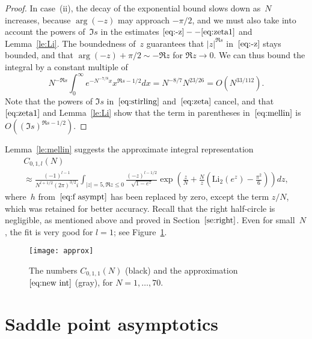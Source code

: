 \documentclass[a4paper]{amsart}
\begin{document}
\begin{proof}
  In case~(ii), the decay of the exponential bound slows down as~$N$ increases,
  because $\arg(-z)$ may approach $-\pi/2$, and we must also take into
  account the powers of~$\Im s$ in the estimates $\eqref{eq:-z}--\ref{eq:zeta1}$
  and Lemma~\ref{le:Li}.
  The boundedness of~$z$ guarantees 
  that $|z|^{\Re s}$ in~$\eqref{eq:-z}$ stays bounded,
  and that $\arg(-z) + \pi/2 \sim -\Re z$ for $\Re z\to0$.
  We can thus bound the integral by a constant multiple of
  \[
    N^{-\Re s}\int_0^\infty e^{-N^{-7/8}x} x^{\Re s-1/2}dx=
     N^{-8/7} N^{23/26}=O(N^{33/112}).
  \]
  Note that the powers of $\Im s$ in~$\eqref{eq:stirling}$ and~$\eqref{eq:zeta}$ cancel, and
  that~$\eqref{eq:zeta1}$ and Lemma~\ref{le:Li} show that the term in parentheses
  in~$\eqref{eq:mellin}$ is $O((\Im s)^{\Re s-1/2})$.
\end{proof}

Lemma~\ref{le:mellin} suggests the approximate integral representation
\begin{multline}\label{eq:new int}
  C_{0,1,l}(N) \\ \approx \frac{(-1)^{l-1}}{N^{l+1/2}(2\pi)^{3/2}i}
  \int_{|z|=5, \Re z\leq 0}
  \frac{(-z)^{l-1/2}}{\sqrt{1-e^z}} \exp\left( \frac{z}{N} + \frac{N}{z}
  \left( \mathrm{Li}_2(e^z) - \frac{\pi^2}{6}\right) \right) dz,
\end{multline}
where~$h$ from~$\eqref{eq:f asympt}$ has been replaced by zero,
except the term $z/N$, which was retained for better accuracy.
Recall that the right half-circle is negligible, as mentioned
above and proved in Section~$\eqref{se:right}$.
Even for small~$N$, the fit is very good for $l=1$; see Figure~\ref{fig:approx}.
%
\begin{figure}
\begin{center}
\texttt{[image: approx]}
\end{center}
\caption{\label{fig:approx}The numbers $C_{0,1,1}(N)$ (black)
and the approximation~$\eqref{eq:new int}$ (gray), for
$N=1,\dots,70$.}
\end{figure}



\section{Saddle point asymptotics}\label{se:saddle}
\end{document}

